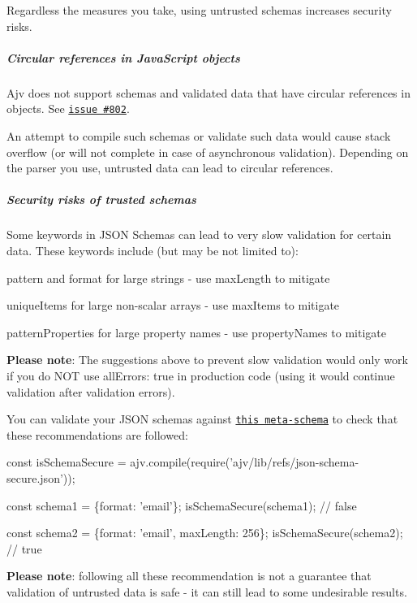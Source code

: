 Regardless the measures you take, using untrusted schemas increases security risks.

\subparagraph*{Circular references in Java\+Script objects}

Ajv does not support schemas and validated data that have circular references in objects. See \href{https://github.com/epoberezkin/ajv/issues/802}{\tt issue \#802}.

An attempt to compile such schemas or validate such data would cause stack overflow (or will not complete in case of asynchronous validation). Depending on the parser you use, untrusted data can lead to circular references.

\subparagraph*{Security risks of trusted schemas}

Some keywords in J\+S\+ON Schemas can lead to very slow validation for certain data. These keywords include (but may be not limited to)\+:


\begin{DoxyItemize}
\item {\ttfamily pattern} and {\ttfamily format} for large strings -\/ use {\ttfamily max\+Length} to mitigate
\item {\ttfamily unique\+Items} for large non-\/scalar arrays -\/ use {\ttfamily max\+Items} to mitigate
\item {\ttfamily pattern\+Properties} for large property names -\/ use {\ttfamily property\+Names} to mitigate
\end{DoxyItemize}

{\bfseries Please note}\+: The suggestions above to prevent slow validation would only work if you do N\+OT use {\ttfamily all\+Errors\+: true} in production code (using it would continue validation after validation errors).

You can validate your J\+S\+ON schemas against \href{https://github.com/epoberezkin/ajv/blob/master/lib/refs/json-schema-secure.json}{\tt this meta-\/schema} to check that these recommendations are followed\+:


\begin{DoxyCode}
const isSchemaSecure = ajv.compile(require('ajv/lib/refs/json-schema-secure.json'));

const schema1 = \{format: 'email'\};
isSchemaSecure(schema1); // false

const schema2 = \{format: 'email', maxLength: 256\};
isSchemaSecure(schema2); // true
\end{DoxyCode}


{\bfseries Please note}\+: following all these recommendation is not a guarantee that validation of untrusted data is safe -\/ it can still lead to some undesirable results.

